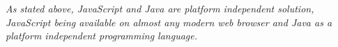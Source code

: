 \emph{As stated above, JavaScript and Java are platform independent solution, JavaScript being available on almost any modern web browser and Java as a platform independent programming language. }